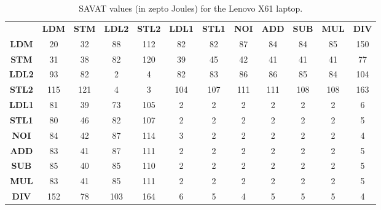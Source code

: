 \begin{table}[htb]
\scriptsize
\setlength{\tabcolsep}{2.3pt}
\setlength\extrarowheight{1pt}
\caption{SAVAT values (in zepto Joules) for the Lenovo X61 laptop.}
\begin{tabular}{|c||c|c|c|c|c|c|c|c|c|c|c|} \hline
& \textbf{LDM} & \textbf{STM} & \textbf{LDL2} & \textbf{STL2} & \textbf{LDL1} & \textbf{STL1} & \textbf{NOI} & \textbf{ADD} & \textbf{SUB} & \textbf{MUL} & \textbf{DIV}
\\ \hhline{|=||=|=|=|=|=|=|=|=|=|=|=|}
\textbf{LDM} &  {20} &  {32} &  {88} &  {112} &  {82} &  {82} &  {87} &  {84} &  {84} &  {85} &  {150} \\ \hline
\textbf{STM} &  {31} &  {38} &  {82} &  {120} &  {39} &  {45} &  {42} &  {41} &  {41} &  {41} &  {77} \\ \hline
\textbf{LDL2} &  {93} &  {82} &  {2} &  {4} &  {82} &  {83} &  {86} &  {86} &  {85} &  {84} &  {104} \\ \hline
\textbf{STL2} &  {115} &  {121} &  {4} &  {3} &  {104} &  {107} &  {111} &  {111} &  {108} &  {108} &  {163} \\ \hline
\textbf{LDL1} &  {81} &  {39} &  {73} &  {105} &  {2} &  {2} &  {2} &  {2} &  {2} &  {2} &  {6} \\ \hline
\textbf{STL1} &  {80} &  {46} &  {82} &  {107} &  {2} &  {2} &  {2} &  {2} &  {2} &  {2} &  {5} \\ \hline
\textbf{NOI} &  {84} &  {42} &  {87} &  {114} &  {3} &  {2} &  {2} &  {2} &  {2} &  {2} &  {4} \\ \hline
\textbf{ADD} &  {83} &  {41} &  {87} &  {111} &  {2} &  {2} &  {2} &  {2} &  {2} &  {2} &  {5} \\ \hline
\textbf{SUB} &  {85} &  {40} &  {85} &  {110} &  {2} &  {2} &  {2} &  {2} &  {2} &  {2} &  {5} \\ \hline
\textbf{MUL} &  {83} &  {41} &  {85} &  {111} &  {2} &  {2} &  {2} &  {2} &  {2} &  {2} &  {5} \\ \hline
\textbf{DIV} &  {152} &  {78} &  {103} &  {164} &  {6} &  {5} &  {4} &  {5} &  {5} &  {5} &  {4} \\ \hline
\end{tabular}
\label{fig:savat-20cm-lx61}
\end{table}

